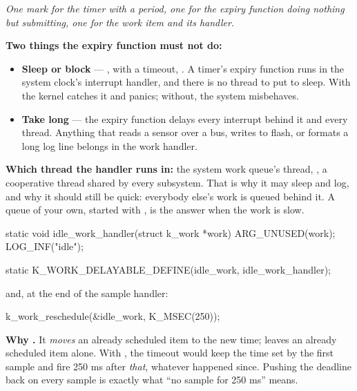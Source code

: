 \noindent\emph{One mark for the timer with a period, one for the expiry function doing nothing but
submitting, one for the work item and its handler.}

\textbf{Two things the expiry function must not do:}
\begin{itemize}
  \item \textbf{Sleep or block} --- ,  with a timeout,
    . A timer's expiry function runs in the system clock's
    interrupt handler, and there is no thread to put to sleep. With  the
    kernel catches it and panics; without, the system misbehaves.
  \item \textbf{Take long} --- the expiry function delays every interrupt behind it and every
    thread. Anything that reads a sensor over a bus, writes to flash, or formats a long log line
    belongs in the work handler.
\end{itemize}

\noindent{}

\textbf{Which thread the handler runs in:} the system work queue's thread, , a
cooperative thread shared by every subsystem. That is why it may sleep and log, and why it should
still be quick: everybody else's work is queued behind it. A queue of your own, started with
, is the answer when the work is slow. 


\begin{ccode}
static void idle_work_handler(struct k_work *work)
{
	ARG_UNUSED(work);
	LOG_INF("idle");
}

static K_WORK_DELAYABLE_DEFINE(idle_work, idle_work_handler);
\end{ccode}

\noindent and, at the end of the sample handler:

\begin{ccode}
	k_work_reschedule(&idle_work, K_MSEC(250));
\end{ccode}

\noindent{}

\textbf{Why .} It \emph{moves} an already scheduled item to the new time;
 leaves an already scheduled item alone. With , the timeout
would keep the time set by the first sample and fire 250 ms after \emph{that}, whatever happened
since. Pushing the deadline back on every sample is exactly what ``no sample for 250 ms'' means.

